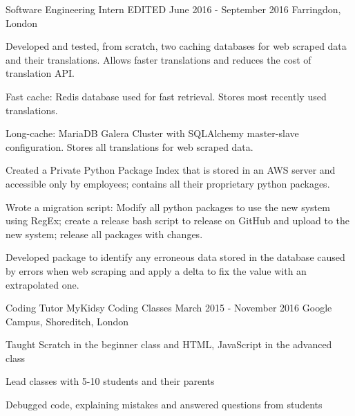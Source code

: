 

\begin{cventries}

  \cventry
    {Software Engineering Intern} %
    {EDITED} %
    {June 2016 - September 2016} %
    {Farringdon, London} %
    {
      \begin{cvitems} %
        \item {Developed and tested, from scratch, two caching databases for web scraped data and their translations. Allows faster translations and reduces the cost of translation API. }
        \item {Fast cache: Redis database used for fast retrieval. Stores most recently used translations.}
        \item {Long-cache: MariaDB Galera Cluster with SQLAlchemy master-slave configuration. Stores all translations  for web scraped data. }
        \item {Created a Private Python Package Index that is stored in an AWS server and accessible only by employees; contains all their proprietary python packages.}
        \item {Wrote a migration script: Modify all python packages to use the new system using RegEx; create a release bash script to release on GitHub and upload to the new system; release all packages with changes. }
        \item {Developed package to identify any erroneous data stored in the database caused by errors when web scraping and apply a delta to fix the value with an extrapolated one.}
      \end{cvitems}
    }

  \cventry
    {Coding Tutor} %
    {MyKidsy Coding Classes} %
    {March 2015 - November 2016} %
    {Google Campus, Shoreditch, London} %
    {
      \begin{cvitems} %
      	\item {Taught Scratch in the beginner class and HTML, JavaScript in the advanced class}
        \item {Lead classes with 5-10 students and their parents}
        \item {Debugged code, explaining mistakes and answered questions from students}
      \end{cvitems}
    }
    

\end{cventries}
